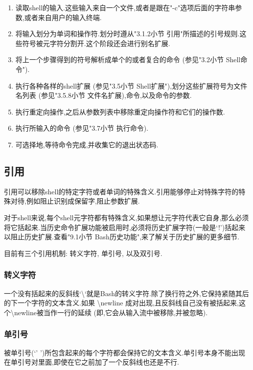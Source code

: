 \documentclass[draft,openany]{book}
\begin{document}
\begin{CJK}{UTF8}{gbsn}
    \begin{enumerate}
        \item 读取shell的输入.这些输入来自一个文件,或者是跟在"-c"选项后面的字符串参数,或者来自用户的输入终端.
        \item 将输入划分为单词和操作符.划分时遵从"3.1.2小节 引用"所描述的引号规则.这些符号被元字符分割开.这个阶段还会进行别名扩展.
        \item 将上一个步骤得到的符号解析成单个的或者复合的命令 (参见"3.2小节 Shell命令").
        \item 执行各种各样的shell扩展 (参见"3.5小节 Shell扩展"),划分这些扩展符号为文件名列表 (参见"3.5.8小节 文件名扩展),命令,以及命令的参数.
        \item 执行重定向操作,之后从参数列表中移除重定向操作符和它们的操作数.
        \item 执行所输入的命令 (参见"3.7小节 执行命令).
        \item 可选择地,等待命令完成,并收集它的退出状态码.
    \end{enumerate}

    \subsection{引用}
    引用可以移除shell的特定字符或者单词的特殊含义.引用能够停止对特殊字符的特殊对待,例如阻止识别成保留字,阻止参数扩展.\par
    对于shell来说,每个shell元字符都有特殊含义,如果想让元字符代表它自身,那么必须将它括起来.当历史命令扩展功能被启用时,必须将历史扩展字符(一般是`!')括起来以阻止历史扩展.查看"9.1小节 Bash历史功能",来了解关于历史扩展的更多细节.\par
    目前有三个引用机制: 转义字符, 单引号, 以及双引号.

    \subsubsection{转义字符}
    一个没有括起来的反斜线`\textbackslash`就是Bash的转义字符.除了换行符之外,它保持紧随其后的下一个字符的文本含义.如果 \textbackslash newline 成对出现,且反斜线自己没有被括起来,这个\textbackslash newline被当作一行的延续 (即,它会从输入流中被移除,并被忽略).

    \subsubsection{单引号}
    被单引号(`' ')所包含起来的每个字符都会保持它的文本含义.单引号本身不能出现在单引号对里面,即使在它之前加了一个反斜线也还是不行.


\end{CJK}
\end{document}
